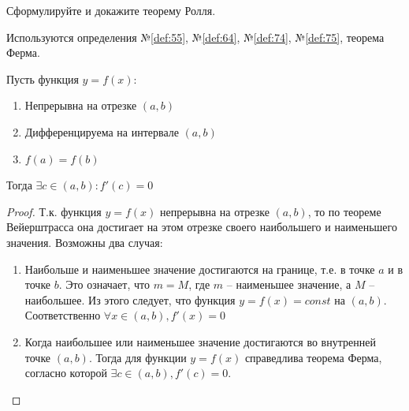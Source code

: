 \begin{question}
    Сформулируйте и докажите теорему Ролля.
\end{question}
\begin{used}
    Используются определения №\ref{def:55}, №\ref{def:64}, №\ref{def:74}, №\ref{def:75}, теорема Ферма.
\end{used}
\begin{theorem}
    Пусть функция $y = f(x)$:
     \begin{enumerate}
      \item Непрерывна на отрезке $(a, b)$ 
      \item Дифференцируема на интервале  $(a, b)$
      \item $f(a) = f(b)$
    \end{enumerate}
    Тогда $\exists c \in (a, b) : f'(c) = 0$
\end{theorem}
\begin{proof}
    Т.к. функция $y = f(x)$ непрерывна на отрезке $(a,b)$, то по теореме Вейерштрасса она достигает на этом отрезке своего наибольшего и наименьшего значения. Возможны два случая:
    \begin{enumerate}
        \item Наибольше и наименьшее значение достигаются на границе, т.е. в точке $a$ и в точке  $b$. Это означает, что  $m = M$, где  $m$ -- наименьшее значение, а  $M$ -- наибольшее. Из этого следует, что функция  $y = f(x) = const$ на $(a, b)$. Соответственно  $\forall x \in (a, b), f'(x) = 0$
        \item Когда наибольшее или наименьшее значение достигаются во внутренней точке $(a, b)$. Тогда для функции $y = f(x)$ справедлива теорема Ферма, согласно которой $\exists c \in (a, b), f'(c) = 0$.
    \end{enumerate}
\end{proof}
\pagebreak



